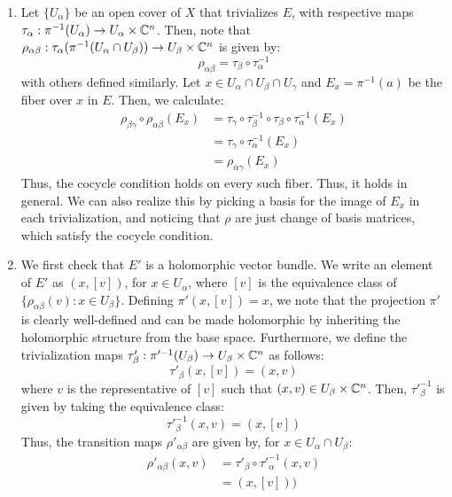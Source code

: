 \documentclass[12pt]{article}
\begin{document}
\begin{solution}
    \bbni
    \begin{enumerate}
        \item Let $\{U_\alpha\}$ be an open cover of $X$ that trivializes $E$, with respective maps $\tau_\alpha: \pi^{-1}(U_\alpha) \to U_\alpha \times \mathbb C^n$. Then, note that $\rho_{\alpha\beta}: \tau_\alpha(\pi^{-1}(U_\alpha \cap U_\beta)) \to U_\beta \times \mathbb C^n$ is given by: 
        \[\rho_{\alpha\beta} = \tau_\beta \circ \tau_\alpha^{-1}  \] 
        with others defined similarly. Let $x \in U_\alpha \cap U_\beta \cap U_\gamma$ and $E_x = \pi^{-1}(a)$ be the fiber over $x$ in $E$. Then, we calculate: 
        \begin{align*}
            \rho_{\beta\gamma} \circ \rho_{\alpha\beta}(E_x) &= \tau_\gamma \circ \tau_\beta^{-1} \circ \tau_\beta \circ \tau_\alpha^{-1}(E_x) \\
            &= \tau_\gamma \circ \tau_\alpha^{-1}(E_x) \\
            &= \rho_{\alpha\gamma}(E_x)
        \end{align*}
        Thus, the cocycle condition holds on every such fiber. Thus, it holds in general. We can also realize this by picking a basis for the image of $E_x$ in each trivialization, and noticing that $\rho$ are just change of basis matrices, which satisfy the cocycle condition. 
        \item We first check that $E'$ is a holomorphic vector bundle. We write an element of $E'$ as $(x, [v])$, for $x \in U_\alpha$, where $[v]$ is the equivalence class of $\{\rho_{\alpha\beta}(v): x \in U_\beta\}$. \bbni 
        Defining $\pi'(x, [v]) = x$, we note that the projection $\pi'$ is clearly well-defined and can be made holomorphic by inheriting the holomorphic structure from the base space. \bbni
        Furthermore, we define the trivialization maps $\tau'_\beta: \pi'^{-1}(U_\beta) \to U_\beta \times \mathbb C^n$ as follows:
        \[
            \tau'_\beta(x, [v]) = (x, v)
        \]
        where $v$ is the representative of $[v]$ such that $(x, v) \in U_\beta \times \mathbb C^n$. Then, $\tau'^{-1}_\beta$ is given by taking the equivalence class: 
        \[ \tau'^{-1}_\beta(x, v) = (x, [v]) \]
        Thus, the transition maps $\rho'_{\alpha\beta}$ are given by, for $x \in U_\alpha \cap U_\beta$:
        \begin{align*}
            \rho'_{\alpha\beta}(x, v) &= \tau'_\beta \circ \tau'^{-1}_\alpha(x, v) \\
            &= (x, [v])) \\

\end{align*}
\end{enumerate}
\end{solution}
\end{document}
